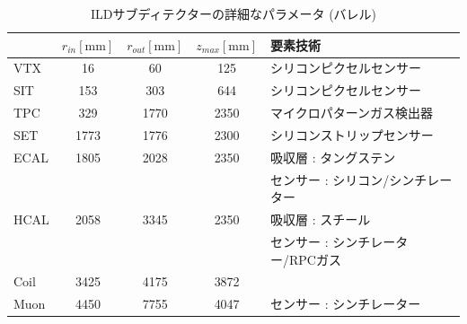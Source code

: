 \begin{table}[htb]
 \centering
  \small
  \begin{tabular}{l c c c l} \hline
     & $r_{in} \mathrm{[mm]}$ & $r_{out} \mathrm{[mm]}$ & $z_{max} \mathrm{[mm]}$ & 要素技術\\ \hline \hline
    VTX & 16 & 60 & 125 & シリコンピクセルセンサー\\
    SIT & 153 & 303 & 644 & シリコンピクセルセンサー\\
    TPC & 329 & 1770 & 2350 & マイクロパターンガス検出器\\
    SET & 1773 & 1776 & 2300 & シリコンストリップセンサー\\ \hline
    ECAL & 1805 & 2028 & 2350 & 吸収層 : タングステン\\
    &&&& センサー : シリコン/シンチレーター\\
    HCAL & 2058 & 3345 & 2350 & 吸収層 : スチール\\
    &&&& センサー : シンチレーター/RPCガス\\ \hline
    Coil & 3425 & 4175 & 3872\\
    Muon & 4450 & 7755 & 4047 & センサー : シンチレーター\\ \hline
  \end{tabular}
  \caption{ILDサブディテクターの詳細なパラメータ (バレル) \cite{InterimDesignReport}}
  \label{ILDSubdetectorParametersBarrel}
\end{table}

